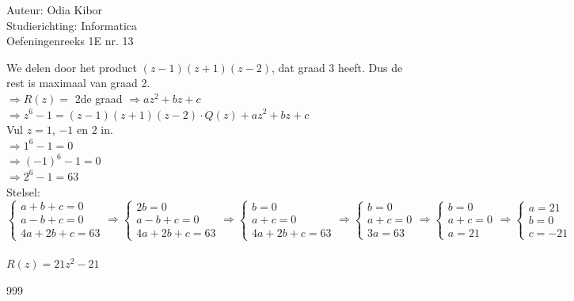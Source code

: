 \documentclass[a4paper]{article}
\begin{document}
  
\noindent \large Auteur: Odia Kibor \\
\noindent \large Studierichting: Informatica\\
\noindent \large Oefeningenreeks 1E nr. 13\\

\medskip

\normalsize


We delen door het product $(z-1)(z+1)(z-2)$, dat graad 3 heeft.
Dus de rest is maximaal van graad 2.\\

$\Rightarrow R(z) = $ 2de graad $\Rightarrow  az^2 + bz + c$\\

$\Rightarrow z^6 - 1 = (z-1)(z+1)(z-2) \cdot Q(z) + az^2 + bz + c$\\

Vul $z = 1$, $-1$ en $2$ in.\\

$\Rightarrow 1^6 - 1 = 0$\\

$\Rightarrow (-1)^6 - 1 = 0$\\

$\Rightarrow 2^6 - 1 = 63$\\

Stelsel:\\


$\left\{
	\begin{array}{l} 
		a + b + c = 0\\
		a - b + c = 0\\
        4a + 2b + c = 63
	\end{array}
\right .
\Rightarrow
\left\{
	\begin{array}{l} 
		2b = 0\\
		a - b + c = 0\\
        4a + 2b + c = 63
	\end{array}
\right .
\Rightarrow
\left\{
	\begin{array}{l} 
		b = 0\\
		a + c = 0\\
        4a + 2b + c = 63
	\end{array}
\right .
\Rightarrow
\left\{
	\begin{array}{l} 
		b = 0\\
		a + c = 0\\
        3a = 63
	\end{array}
\right .
\Rightarrow
\left\{
	\begin{array}{l} 
		b = 0\\
		a + c = 0\\
        a = 21
	\end{array}
\right .
\Rightarrow
\left\{
	\begin{array}{l} 
		a = 21\\
		b = 0\\
        c = -21
	\end{array}
\right .$\\\\

$R(z) = 21z^2 - 21$









\begin{thebibliography}{999}
\end{thebibliography}
\end{document}
